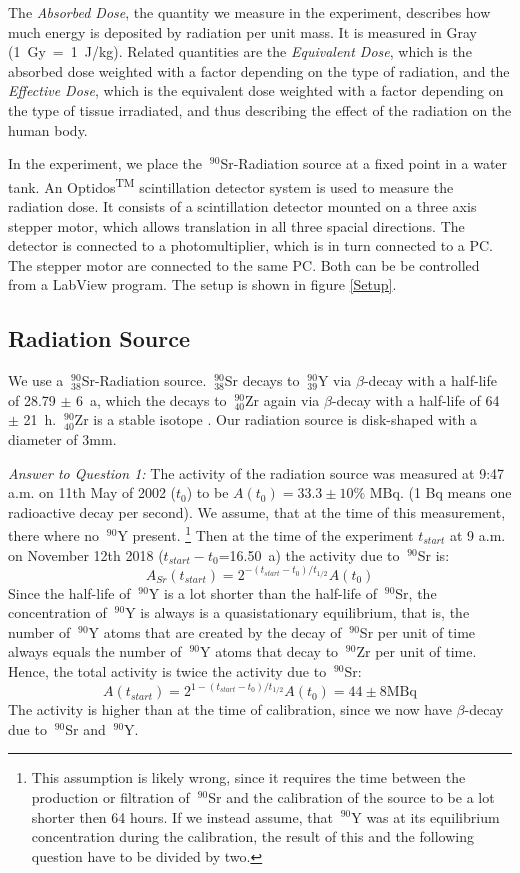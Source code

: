 \documentclass[a4paper,parskip]{scrartcl}
\begin{document}
The \textit{Absorbed Dose}, the quantity we measure in the experiment, describes how much energy is deposited by radiation per unit mass. It is measured in Gray (1~Gy~=~1~J/kg). Related quantities are the \textit{Equivalent Dose}, which is the absorbed dose weighted with a factor depending on the type of radiation, and the \textit{Effective Dose}, which is the equivalent dose weighted with a factor depending on the type of tissue irradiated, and thus describing the effect of the radiation on the human body.

In the experiment, we place the $~^{90}$Sr-Radiation source at a fixed point in a water tank. An Optidos\textsuperscript{TM} scintillation detector system is used to measure the radiation dose. It consists of a scintillation detector mounted on a three axis stepper motor, which allows translation in all three spacial directions. The detector is connected to a photomultiplier, which is in turn connected to a PC. The stepper motor are connected to the same PC. Both can be be controlled from a LabView program. The setup is shown in figure \ref{Setup}.

\subsection{Radiation Source}

We use a $~^{90}_{38}$Sr-Radiation source. $~^{90}_{38}$Sr decays to $~^{90}_{39}$Y via $\beta$-decay with a half-life of 28.79 $\pm$ 6~a, which the decays to $~^{90}_{40}$Zr again via $\beta$-decay with a half-life of 64 $\pm$ 21~h.  $~^{90}_{40}$Zr is a stable isotope \cite{Ref:2}. Our radiation source is disk-shaped with a diameter of 3mm.

\textit{Answer to Question 1:} The activity of the radiation source was measured at 9:47 a.m.
on 11th May of 2002 ($t_0$) to be $A(t_0) = 33.3 \pm 10\% \textrm{ MBq}$. (1 Bq means one radioactive decay per second). We assume, that at the time of this measurement, there where no $~^{90}$Y present. \footnote{This assumption is likely wrong, since it requires the time between the production or filtration of $~^{90}$Sr and the calibration of the source to be a lot shorter then 64 hours. If we instead assume, that $~^{90}$Y was at its equilibrium concentration during the calibration, the result of this and the following question have to be divided by two.} Then at the time of the experiment $t_{start}$ at 9 a.m. on November 12th 2018 ($t_{start}-t_0$=16.50~a) the activity due to $~^{90}$Sr  is:
$$A_{Sr}(t_{start}) = 2^{-(t_{start}-t_0)/t_{1/2}}A(t_0)$$
Since the half-life of $~^{90}$Y is a lot shorter than the half-life of $~^{90}$Sr, the concentration of $~^{90}$Y is always is a quasistationary equilibrium, that is, the number of $~^{90}$Y atoms that are created by the decay of $~^{90}$Sr per unit of time always equals the number of $~^{90}$Y atoms that decay to $~^{90}$Zr per unit of time. Hence, the total activity is twice the activity due to $~^{90}$Sr:
$$A(t_{start})= 2^{1-(t_{start}-t_0)/t_{1/2}}A(t_0) = 44 \pm 8 \textrm{MBq}$$
The activity is higher than at the time of calibration, since we now have $\beta$-decay due to $~^{90}$Sr and $~^{90}$Y.  
\end{document}
